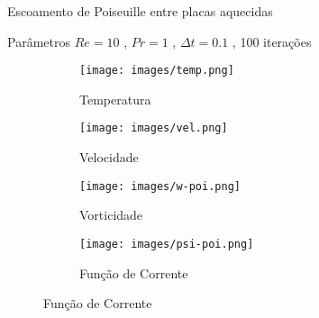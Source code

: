 \documentclass{beamer}
\begin{document}
    \begin{frame}{Escoamento de Poiseuille entre placas aquecidas}
    		 \begin{block}{Parâmetros}
			$Re = 10$ , $Pr = 1$ , $\Delta t = 0.1$ , 100 iterações		
		 \end{block}
        \begin{figure}[H]

  \begin{subfigure}[t]{.5\linewidth}
  	\centering
    \texttt{[image: images/temp.png]}
    \caption{Temperatura}
  \end{subfigure}
  \hspace{-0.182cm}
  \begin{subfigure}[t]{.5\linewidth}
    \centering  
    \texttt{[image: images/vel.png]}
    \caption{Velocidade}
  \end{subfigure}  

	\vspace{0.6cm}  
  
  \begin{subfigure}[t]{.5\linewidth}
   \centering
   \texttt{[image: images/w-poi.png]}
    \caption{Vorticidade}
  \end{subfigure}
  \hspace{-0.182cm}
  \begin{subfigure}[t]{.5\linewidth}
  	\centering
	\texttt{[image: images/psi-poi.png]}
    \caption{Função de Corrente}
  \end{subfigure}
	
		\label{bfs}
\end{figure}        
    \end{frame}
  
   
\end{document}
